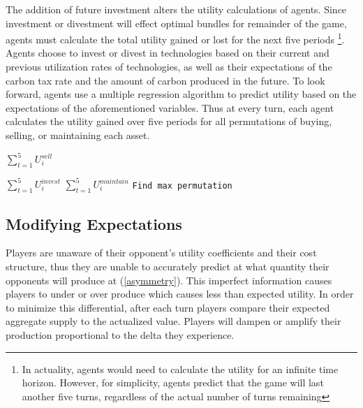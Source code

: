 \documentclass[12pt]{article}
\begin{document}
The addition of future investment alters the utility calculations of agents. Since investment or divestment will effect optimal bundles for remainder of the game, agents must calculate the total utility gained or lost for the next five periods \footnote{In actuality, agents would need to calculate the utility for an infinite time horizon. However, for simplicity, agents predict that the game will last another five turns, regardless of the actual number of turns remaining}. Agents choose to invest or divest in technologies based on their current and previous utilization rates of technologies, as well as their expectations of the carbon tax rate and the amount of carbon produced in the future. To look forward, agents use a multiple regression algorithm to predict utility based on the expectations of the aforementioned variables. Thus at every turn, each agent calculates the utility gained over five periods for all permutations of buying, selling, or maintaining each asset. \\


	\begin{algorithmic}
			\State $\sum_{t=1}^{5}U_i^{sell}$

			\State $\sum_{t=1}^{5}U_i^{invest}$
					\State $\sum_{t=1}^{5}U_i^{maintain}$
		\EndFor
		\EndFor
		\EndFor
		\State \texttt{Find max permutation}
	\end{algorithmic}



\subsection{Modifying Expectations}
Players are unaware of their opponent's utility coefficients and their cost structure, thus they are unable to accurately predict at what quantity their opponents will produce at (\cref{asymmetry}). This imperfect information causes players to under or over produce which causes less than expected utility. In order to minimize this differential, after each turn players compare their expected aggregate supply to the actualized value. Players will dampen or amplify their production proportional to the delta they experience. 
\end{document}

